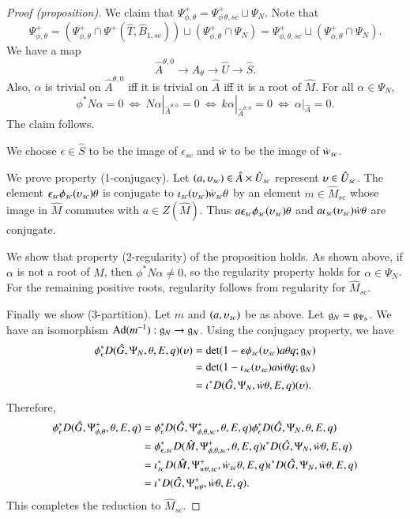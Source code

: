 \begin{proof}[Proof (proposition)]
  We claim that $\Psi_{\phi,\theta}^+ = \Psi_{\phi\,\theta,sc}^+\sqcup \Psi_N$.
  Note that 
  \[
  \Psi_{\phi,\theta}^+ = (\Psi_{\phi,\theta}^+\cap \Psi^+(\hat T,\hat B_{1,sc})) \sqcup
(\Psi_{\phi,\theta}^+ \cap \Psi_N) = 
\Psi_{\phi,\theta,sc}^+\sqcup (\Psi_{\phi,\theta}^+ \cap \Psi_N).
\]
We have a  map
  \[
  \hat A^{\theta,0} \to  \hat A_\theta \to \hat U \to \hat S.
  \]
  Also, $\alpha$ is trivial on $\hat A^{\theta,0}$ iff it is trivial on $\hat A$
  iff it is a root of $\hat M$.  For all $\alpha\in \Psi_N$,
  \[
  \phi^* N\alpha = 0 \ \Leftrightarrow \ 
  N\alpha|_{\hat A^{\theta,0}}=0 \ \Leftrightarrow \ 
  k\alpha|_{\hat A^{\theta,0}}=0 \ \Leftrightarrow \ 
  \alpha|_{\hat A}=0.
  \]
  The claim follows.

  We choose $\epsilon\in \hat S$ to be the image of $\epsilon_{sc}$ and $\dot w$ to be
  the image of $\dot w_{sc}$.

    We prove property (1-conjugacy).  Let  $(a,\upsilon_{sc})\in \hat A\times \hat U_{sc}$
    represent $\upsilon\in \hat U_{sc}$.  The element $\epsilon_{sc}\phi_{sc}(\upsilon_{sc}) \theta$
    is conjugate to $\iota_{sc}(\upsilon_{sc})\dot w_{sc}\theta$ by an element $m\in\hat M_{sc}$
    whose image in $\hat M$ commutes with $a\in Z(\hat M)$.  Thus
    $a \epsilon_{sc}\phi_{sc}(\upsilon_{sc}) \theta$ and $a\iota_{sc}(\upsilon_{sc})\dot w\theta$ are
    conjugate.

    We show that property (2-regularity) of the proposition holds.  As
    shown above, if $\alpha$ is not a root of $\hat M$, then
    $\phi^*N\alpha\ne 0$, so the regularity property holds for 
    $\alpha\in\Psi_N$.   For the remaining positive roots, regularity
    follows from regularity for $\hat M_{sc}$.

    Finally we show (3-partition).  Let $m$ and  $(a,\upsilon_{sc})$ be as above.
    Let ${\mathfrak g}_N = {\mathfrak g}_{\Psi_N}$.
    We have an isomorphism ${\operatorname{Ad}}(m^{-1}):{\mathfrak g}_N\to {\mathfrak g}_N$.
    Using the conjugacy property, we have
    \begin{align*}
      \phi_\epsilon^* D(\hat G,\Psi_N,\theta,E,q)(\upsilon) &=
      \det(1-\epsilon \phi_{sc}(\upsilon_{sc}) a \theta q;{\mathfrak g}_N) \\
      &=
      \det(1-  \iota_{sc}(\upsilon_{sc})  a \dot w\theta q;{\mathfrak g}_N) \\
      &=
      \iota^* D(\hat G,\Psi_N,\dot w\theta,E,q)(\upsilon).
      \end{align*}
Therefore,
\begin{align*}
\phi_\epsilon^* D(\hat G,\Psi_{\phi,\theta}^+,\theta,E,q) &=
\phi_\epsilon^* D(\hat G,\Psi_{\phi,\theta,sc}^+,\theta,E,q)
\phi_\epsilon^* D(\hat G,\Psi_N,\theta,E,q) \\
&=
\phi_{\epsilon,sc}^* D(\hat M,\Psi_{\phi,\theta,sc}^+,\theta,E,q)
\iota^* D(\hat G,\Psi_N,\dot w\theta,E,q)\\
&=
\iota_{sc}^* D(\hat M,\Psi_{w\theta,sc}^+,\dot w_{sc}\theta,E,q)
\iota^* D(\hat G,\Psi_N,\dot w\theta,E,q)\\
&=
\iota^* D(\hat G,\Psi_{w\theta}^+,\dot w\theta,E,q).
\end{align*}
This completes the reduction to $\hat M_{sc}$.    


\end{proof}
